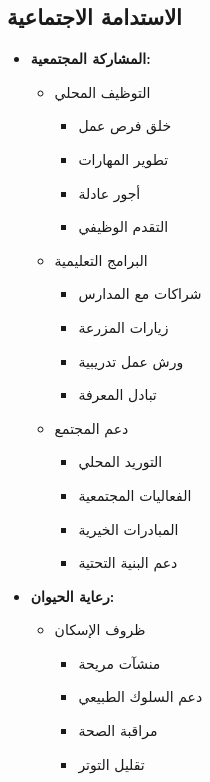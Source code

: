 \subsection{الاستدامة الاجتماعية}
\begin{itemize}
    \item \textbf{المشاركة المجتمعية:}
    \begin{itemize}
        \item التوظيف المحلي
        \begin{itemize}
            \item خلق فرص عمل
            \item تطوير المهارات
            \item أجور عادلة
            \item التقدم الوظيفي
        \end{itemize}
        
        \item البرامج التعليمية
        \begin{itemize}
            \item شراكات مع المدارس
            \item زيارات المزرعة
            \item ورش عمل تدريبية
            \item تبادل المعرفة
        \end{itemize}
        
        \item دعم المجتمع
        \begin{itemize}
            \item التوريد المحلي
            \item الفعاليات المجتمعية
            \item المبادرات الخيرية
            \item دعم البنية التحتية
        \end{itemize}
    \end{itemize}
    
    \item \textbf{رعاية الحيوان:}
    \begin{itemize}
        \item ظروف الإسكان
        \begin{itemize}
            \item منشآت مريحة
            \item دعم السلوك الطبيعي
            \item مراقبة الصحة
            \item تقليل التوتر
        \end{itemize}
        

\end{itemize}
\end{itemize}
